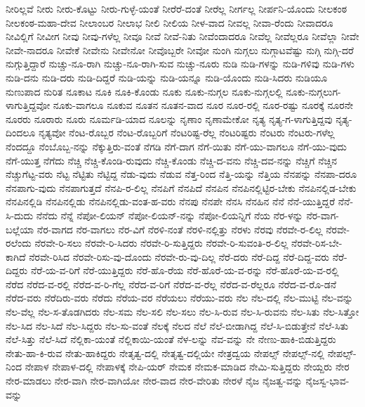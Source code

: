 {ನೀರಿಲ್ಲವೆ
ನೀರು
ನೀರು-ಕೊಟ್ಟು
ನೀರು-ಗುಳ್ಳೆ-ಯಂತೆ
ನೀರೆರೆ-ದಂತೆ
ನೀರೆಲ್ಲ
ನೀರ್ಗಲ್ಲ
ನೀರ್ಪನಿ-ಯೊಂದು
ನೀಲಕಂಠ
ನೀಲಕಂಠ-ಮಹಾ-ದೇವ
ನೀಲಾಂಬರ
ನೀಲಾಭ
ನೀಲಿ
ನೀಲಿಯ
ನೀಳ-ವಾದ
ನೀವಲ್ಲ
ನೀವಾ-ರೆಂದು
ನೀವಾದರೂ
ನೀವಿಲ್ಲಿಗೆ
ನೀವೀಗ
ನೀವು
ನೀವು-ಗಳೆಲ್ಲ
ನೀವೂ
ನೀವೆ
ನೀವೆ-ನಿತು
ನೀವೆಂದಾದರೂ
ನೀವೆಲ್ಲ
ನೀವೆಲ್ಲರೂ
ನೀವೆಲ್ಲಾ
ನೀವೇ
ನೀವೇ-ನಾದರೂ
ನೀವೇಕೆ
ನೀವೇನು
ನೀವೇನೋ
ನೀವೊಬ್ಬರೇ
ನೀವೋ
ನುಂಗಿ
ನುಗ್ಗಲು
ನುಗ್ಗಾಟವೆಷ್ಟು
ನುಗ್ಗಿ
ನುಗ್ಗಿ-ದರೆ
ನುಗ್ಗುತ್ತಿದ್ದಾರೆ
ನುಚ್ಚು-ನೂ-ರಾಗಿ
ನುಚ್ಚು-ನೂ-ರಾಗಿ-ಸುವ
ನುಚ್ಚು-ನೂರು
ನುಡಿ
ನುಡಿ-ಗಳನ್ನು
ನುಡಿ-ಗಳಿವು
ನುಡಿ-ಗಳು
ನುಡಿ-ದನು
ನುಡಿ-ದರು
ನುಡಿ-ದಿದ್ದರೆ
ನುಡಿ-ಯನ್ನು
ನುಡಿ-ಯನ್ನೂ
ನುಡಿ-ಯೊಂದು
ನುಡಿ-ಸಿದರು
ನುಡಿಯೂ
ನುಣುಪಾದ
ನುರಿತ
ನೂಕಾಟ
ನೂಕಿ
ನೂಕಿ-ಕೊಂಡು
ನೂಕು
ನೂಕು-ನುಗ್ಗಲ
ನೂಕು-ನುಗ್ಗಲಲ್ಲಿ
ನೂಕು-ನುಗ್ಗಲುಗ-ಳಾಗುತ್ತಿದ್ದವೋ
ನೂಕು-ವಾಗಲೂ
ನೂಕುವ
ನೂತನ
ನೂತನ-ವಾದ
ನೂರ
ನೂರ-ರಲ್ಲಿ
ನೂರ-ರಷ್ಟು
ನೂರಕ್ಕೆ
ನೂರನೇ
ನೂರರು
ನೂರಾರು
ನೂರು
ನೂರ್ಮಡಿ-ಯಾದ
ನೂಲನ್ನು
ನೃಣಾಂ
ನೃಣಾಮೇಕೋ
ನೃತ್ಯ
ನೃತ್ಯ-ಗ-ಳಾಗುತ್ತಿದ್ದವು
ನೃತ್ಯ-ದಿಂದಲೂ
ನೃತ್ಯವೋ
ನೆಂಟ-ರೊಬ್ಬರ
ನೆಂಟ-ರೊಬ್ಬರಿಗೆ
ನೆಂಟರಿಷ್ಟ-ರೆಲ್ಲ
ನೆಂಟರಿಷ್ಟರು
ನೆಂಟರು
ನೆಂಟರು-ಗಳೆಲ್ಲ
ನೆಂದದ್ದೂ
ನೆಂಬೊಬ್ಬ-ನನ್ನು
ನೆಕ್ಕುತ್ತಿರು-ವಂತೆ
ನೆಗಡಿ
ನೆಗೆ-ದಾಗ
ನೆಗೆ-ಯಿತು
ನೆಗೆ-ಯು-ವಾಗಲೂ
ನೆಗೆ-ಯು-ವುದು
ನೆಗೆ-ಯುತ್ತ
ನೆಗೆದು
ನೆಚ್ಚಿ
ನೆಚ್ಚಿ-ಕೊಂಡಿ-ರುವುದು
ನೆಚ್ಚಿ-ಕೊಂಡು
ನೆಚ್ಚಿ-ದ-ವನು
ನೆಚ್ಚಿ-ದವ-ನನ್ನು
ನೆಚ್ಚಿಗೆ
ನೆಚ್ಚಿನ
ನೆಚ್ಚುಗೆಟ್ಟ-ವರು
ನೆಟ್ಟ
ನೆಟ್ಟಿತು
ನೆಟ್ಟಿದ್ದ
ನೆಡು-ವುದು
ನೆಡುವ
ನೆತ್ತ-ರಿಂದ
ನೆತ್ತಿ-ಯನ್ನು
ನೆತ್ತಿಯ
ನೆನಪನ್ನು
ನೆನಪಾ-ದರೂ
ನೆನಪಾಗು-ವುದು
ನೆನಪಾಗುತ್ತದೆ
ನೆನಪಿ-ರ-ಲಿಲ್ಲ
ನೆನಪಿಗೆ
ನೆನಪಿದೆ
ನೆನಪಿನ
ನೆನಪಿನಲ್ಲಿಟ್ಟಿರ-ಬೇಕು
ನೆನಪಿನಲ್ಲಿಡ-ಬೇಕು
ನೆನಪಿನಲ್ಲಿಡಿ
ನೆನಪಿನಲ್ಲಿಡು
ನೆನಪಿನಲ್ಲಿಡು-ವಂತ-ಹ-ವರು
ನೆನಪು
ನೆನಪೇ
ನೆನಸಿ
ನೆನಹಿನ
ನೆನೆ
ನೆನೆ-ಯುತ್ತಿದ್ದರೆ
ನೆನೆ-ಸಿ-ದುದು
ನೆನೆದು
ನೆನ್ನೆ
ನೆಪೋ-ಲಿಯನ್
ನೆಪೋ-ಲಿಯನ್-ನನ್ನು
ನೆಪೋ-ಲಿಯನ್ನಿಗೆ
ನೆಯ
ನೆರ-ಳನ್ನು
ನೆರ-ವಾಗ-ಬಲ್ಲೆಯಾ
ನೆರ-ವಾಗದ
ನೆರ-ವಾಗಲು
ನೆರ-ವಿಗೆ
ನೆರಳಿ-ನಂತೆ
ನೆರಳಿ-ನಲ್ಲಿತ್ತು
ನೆರಳು
ನೆರವು
ನೆರವೇ-ರ-ಲಿಲ್ಲ
ನೆರವೇ-ರಲೆಂದು
ನೆರವೇ-ರಿ-ಸಲು
ನೆರವೇ-ರಿ-ಸಿದರು
ನೆರವೇ-ರಿ-ಸುತ್ತಿದ್ದರು
ನೆರವೇ-ರಿ-ಸುವಂತಿ-ರ-ಲಿಲ್ಲ
ನೆರವೇ-ರಿಸ-ಬೇ-ಕಾಗಿದೆ
ನೆರವೇ-ರಿಸಿದ
ನೆರವೇ-ರಿಸು-ವು-ದೊಂದು
ನೆರವೇ-ರು-ವು-ದಿಲ್ಲ
ನೆರೆ-ದರು
ನೆರೆ-ದಿದ್ದ
ನೆರೆ-ದಿದ್ದ-ವರು
ನೆರೆ-ದಿದ್ದರು
ನೆರೆ-ಯ-ವ-ರಿಗೆ
ನೆರೆ-ಯುತ್ತಿದ್ದರು
ನೆರೆ-ಹೊ-ರೆಯ
ನೆರೆ-ಹೊರೆ-ಯ-ವ-ರನ್ನು
ನೆರೆ-ಹೊರೆ-ಯ-ವ-ರಲ್ಲಿ
ನೆರೆದ
ನೆರೆದ-ವ-ರಲ್ಲಿ
ನೆರೆದ-ವ-ರಿ-ಗೆಲ್ಲ
ನೆರೆದ-ವ-ರಿಗೆ
ನೆರೆದ-ವ-ರೆಲ್ಲ
ನೆರೆದ-ವ-ರೆಲ್ಲರೂ
ನೆರೆದ-ವ-ರೊ-ಡನೆ
ನೆರೆದ-ವರು
ನೆರೆದಿರು-ವರು
ನೆರೆದು
ನೆರೆಯ-ವರ
ನೆರೆಯಲು
ನೆರೆಯು-ವರು
ನೆಲ
ನೆಲ-ದಲ್ಲಿ
ನೆಲ-ಮುಟ್ಟಿ
ನೆಲ-ವನ್ನು
ನೆಲ-ವೆಲ್ಲ
ನೆಲ-ಸ-ತೊಡಗಿದರು
ನೆಲ-ಸಮ
ನೆಲ-ಸಲಿ
ನೆಲ-ಸಲು
ನೆಲ-ಸಿ-ರುವ
ನೆಲ-ಸಿ-ರುವನು
ನೆಲ-ಸಿತು
ನೆಲ-ಸಿತ್ತೋ
ನೆಲ-ಸಿದ
ನೆಲ-ಸಿದೆ
ನೆಲ-ಸಿದ್ದರು
ನೆಲ-ಸು-ವಂತೆ
ನೆಲಕ್ಕೆ
ನೆಲದ
ನೆಲೆ
ನೆಲೆ-ಬೀಡಾಗಿದ್ದ
ನೆಲೆ-ಸಿ-ಬಿಡುತ್ತೇನೆ
ನೆಲೆ-ಸಿತು
ನೆಲೆ-ಸಿತ್ತು
ನೆಲೆ-ಸಿದೆ
ನೆಲ್ಲಿಕಾ-ಯಂತೆ
ನೆಲ್ಲಿಕಾಯಿ-ಯಂತೆ
ನೆಳ-ಲನ್ನು
ನೆವ-ವನ್ನು
ನೇ
ನೇಣು-ಹಾಕಿ-ಬಿಡುತ್ತಿದ್ದರು
ನೇತು-ಹಾ-ಕಿ-ರುವ
ನೇತು-ಹಾಕಿದ್ದರು
ನೇತೃತ್ವ-ದಲ್ಲಿ
ನೇತೃತ್ವ-ದಲ್ಲಿಯೇ
ನೇತ್ರದ್ವಯ
ನೇಪಲ್ಸ್
ನೇಪಲ್ಸ್-ನಲ್ಲಿ
ನೇಪಲ್ಸ್-ನಿಂದ
ನೇಪಾಳ
ನೇಪಾಳ-ದಲ್ಲಿ
ನೇಪಾಳಕ್ಕೆ
ನೇಪಿ-ಯರ್
ನೇಮಕ
ನೇಮಕ-ಮಾಡಿದ
ನೇಮಿ-ಸುತ್ತಿದ್ದರು
ನೇಯ್ದರು
ನೇರ
ನೇರ-ಮಾಡಲು
ನೇರ-ವಾಗಿ
ನೇರ-ವಾಗಿಯೋ
ನೇರ-ವಾದ
ನೇರ-ವೇರಿತು
ನೇರಳೆ
ನೈಜ
ನೈಜತ್ವ-ವನ್ನು
ನೈಜಸ್ವ-ಭಾವ-ವನ್ನು
}
